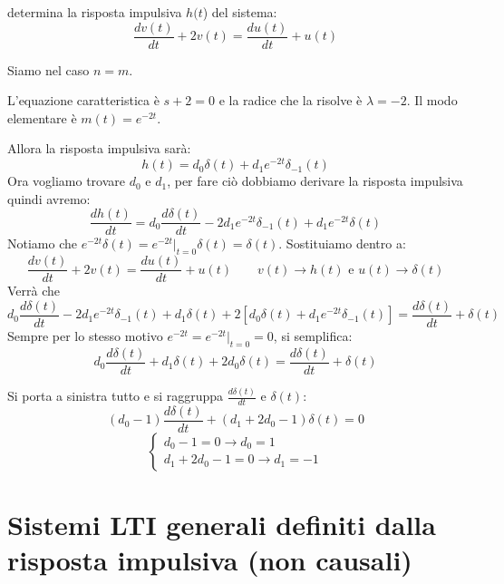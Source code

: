 \begin{nexample}

	determina la risposta impulsiva $ h(t $) del sistema:
	\[ \frac{dv(t)}{dt} + 2v(t) = \frac{du(t)}{dt} + u(t) \]
	\begin{NB}
		Siamo nel caso $n=m$.
	\end{NB}
	
	L'equazione caratteristica è $ s+2=0$ e la radice che la risolve è $ \lambda = -2$.
	Il modo elementare è $ m(t) = e^{-2t} $.
	
	Allora la risposta impulsiva sarà:
	\[ 
		h(t) = d_0 \delta (t) + d_1 e^{-2t} \delta_{-1}(t)  
	\]
	Ora vogliamo trovare $ d_0 $ e $ d_1 $, per fare ciò dobbiamo derivare la risposta impulsiva quindi avremo:\\
	\[ 
		\frac{d h(t)}{dt} 
		= d_0 \frac{d \delta (t)}{dt} 
		- 2 d_1 e^{-2t} \delta_{-1}(t)
		+ d_1 e^{-2t} \delta(t) 
	 \]
	Notiamo che $\displaystyle	e^{-2t} \delta (t) = e^{-2t}\big\vert_{t=0} \delta (t)= \delta (t) $. Sostituiamo dentro a:
	\[
		\frac{dv(t)}{dt} + 2v(t) = \frac{du(t)}{dt} + u(t) \qquad v(t) \rightarrow h(t) \text{ e }  u(t) \rightarrow \delta (t) 
	\]
	Verrà che  
	\[ 
		d_0 \frac{d \delta (t)}{dt} 
		- 2 d_1 e^{-2t} \delta_{-1}(t)
		+ d_1 \delta(t)
		+2 [d_0 \delta (t) + d_1 e^{-2t} \delta_{-1}(t) ]
		= \frac{d \delta (t)}{dt} + \delta (t) 
	\]
	Sempre per lo stesso motivo $\displaystyle e^{-2t} = e^{-2t}\big\vert_{t=0} = 0$, si semplifica: 
	\[
 		d_0 \frac{d \delta (t)}{dt}
		+ d_1 \delta(t)
		+2 d_0 \delta (t)
		= \frac{d \delta (t)}{dt} + \delta (t) 
	\]
	
	Si porta a sinistra tutto e si raggruppa $\frac{d \delta (t)}{dt}$ e $ \delta (t) $:
	\[
		(d_0-1) \frac{d \delta (t)}{dt}
		+ (d_1 + 2 d_0 -1) \delta(t) =0  
	\]
	\[
 		\begin{cases} 
			d_0 -1=0 \rightarrow d_0=1 \\ 
			d_1 + 2 d_0 -1 = 0 \rightarrow d_1 = -1
		\end{cases} 
	\]
	
\end{nexample}	



\section{Sistemi LTI generali definiti dalla risposta impulsiva (non causali)}
	
